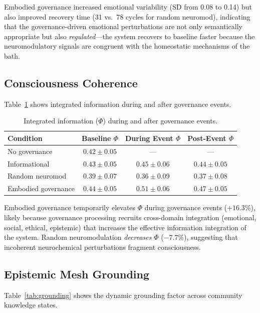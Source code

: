\documentclass[11pt,a4paper]{article}
\begin{document}
Embodied governance increased emotional variability (SD from 0.08 to 0.14) but also improved recovery time (31 vs.\ 78 cycles for random neuromod), indicating that the governance-driven emotional perturbations are not only semantically appropriate but also \emph{regulated}---the system recovers to baseline faster because the neuromodulatory signals are congruent with the homeostatic mechanisms of the bath.

\subsection{Consciousness Coherence}

Table~\ref{tab:phi} shows integrated information during and after governance events.

\begin{table}[h]
\centering
\caption{Integrated information ($\Phi$) during and after governance events.}
\label{tab:phi}
\begin{tabular}{lccc}
\toprule
\textbf{Condition} & \textbf{Baseline $\Phi$} & \textbf{During Event $\Phi$} & \textbf{Post-Event $\Phi$} \\
\midrule
No governance       & $0.42 \pm 0.05$ & --- & --- \\
Informational       & $0.43 \pm 0.05$ & $0.45 \pm 0.06$ & $0.44 \pm 0.05$ \\
Random neuromod     & $0.39 \pm 0.07$ & $0.36 \pm 0.09$ & $0.37 \pm 0.08$ \\
Embodied governance & $0.44 \pm 0.05$ & $0.51 \pm 0.06$ & $0.47 \pm 0.05$ \\
\bottomrule
\end{tabular}
\end{table}

Embodied governance temporarily elevates $\Phi$ during governance events ($+16.3\%$), likely because governance processing recruits cross-domain integration (emotional, social, ethical, epistemic) that increases the effective information integration of the system.
Random neuromodulation \emph{decreases} $\Phi$ ($-7.7\%$), suggesting that incoherent neurochemical perturbations fragment consciousness.

\subsection{Epistemic Mesh Grounding}

Table~\ref{tab:grounding} shows the dynamic grounding factor across community knowledge states.
\end{document}
